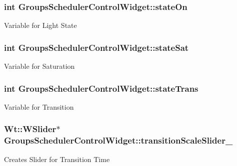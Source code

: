 \subsubsection[{\texorpdfstring{state\+On}{stateOn}}]{\setlength{\rightskip}{0pt plus 5cm}int Groups\+Scheduler\+Control\+Widget\+::state\+On\hspace{0.3cm}{\ttfamily [private]}}\hypertarget{classGroupsSchedulerControlWidget_a06a6c4a3b732562535e90764b16a9917}{}\label{classGroupsSchedulerControlWidget_a06a6c4a3b732562535e90764b16a9917}
Variable for Light State 
\subsubsection[{\texorpdfstring{state\+Sat}{stateSat}}]{\setlength{\rightskip}{0pt plus 5cm}int Groups\+Scheduler\+Control\+Widget\+::state\+Sat\hspace{0.3cm}{\ttfamily [private]}}\hypertarget{classGroupsSchedulerControlWidget_ac8e8767a4971e39f9c238d850d4fd182}{}\label{classGroupsSchedulerControlWidget_ac8e8767a4971e39f9c238d850d4fd182}
Variable for Saturation 
\subsubsection[{\texorpdfstring{state\+Trans}{stateTrans}}]{\setlength{\rightskip}{0pt plus 5cm}int Groups\+Scheduler\+Control\+Widget\+::state\+Trans\hspace{0.3cm}{\ttfamily [private]}}\hypertarget{classGroupsSchedulerControlWidget_a4432bfb83864771828fc7737e6036f70}{}\label{classGroupsSchedulerControlWidget_a4432bfb83864771828fc7737e6036f70}
Variable for Transition 
\subsubsection[{\texorpdfstring{transition\+Scale\+Slider\+\_\+}{transitionScaleSlider_}}]{\setlength{\rightskip}{0pt plus 5cm}Wt\+::\+W\+Slider$\ast$ Groups\+Scheduler\+Control\+Widget\+::transition\+Scale\+Slider\+\_\+\hspace{0.3cm}{\ttfamily [private]}}\hypertarget{classGroupsSchedulerControlWidget_aea1b24fe2b88bd7c36981e5d92314cf3}{}\label{classGroupsSchedulerControlWidget_aea1b24fe2b88bd7c36981e5d92314cf3}
Creates Slider for Transition Time 
